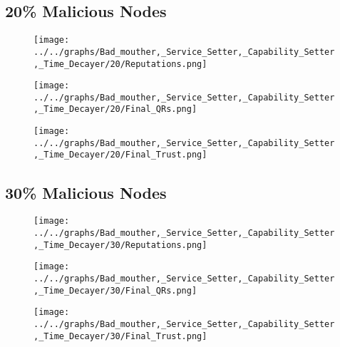\begin{minipage}[t]{0.49\columnwidth}
\subsection*{20\% Malicious Nodes}
    \begin{figure}[H]
        \centering
        \texttt{[image: ../../graphs/Bad\_mouther,\_Service\_Setter,\_Capability\_Setter,\_Time\_Decayer/20/Reputations.png]}
    \end{figure}
    \begin{figure}[H]
        \centering
        \texttt{[image: ../../graphs/Bad\_mouther,\_Service\_Setter,\_Capability\_Setter,\_Time\_Decayer/20/Final\_QRs.png]}
    \end{figure}
\end{minipage}
\begin{minipage}[t]{0.49\columnwidth}
    \begin{figure}[H]
        \centering
        \texttt{[image: ../../graphs/Bad\_mouther,\_Service\_Setter,\_Capability\_Setter,\_Time\_Decayer/20/Final\_Trust.png]}
    \end{figure}
\end{minipage}

\begin{minipage}[t]{0.49\columnwidth}
\subsection*{30\% Malicious Nodes}
    \begin{figure}[H]
        \centering
        \texttt{[image: ../../graphs/Bad\_mouther,\_Service\_Setter,\_Capability\_Setter,\_Time\_Decayer/30/Reputations.png]}
    \end{figure}
    \begin{figure}[H]
        \centering
        \texttt{[image: ../../graphs/Bad\_mouther,\_Service\_Setter,\_Capability\_Setter,\_Time\_Decayer/30/Final\_QRs.png]}
    \end{figure}
\end{minipage}
\begin{minipage}[t]{0.49\columnwidth}
    \begin{figure}[H]
        \centering
        \texttt{[image: ../../graphs/Bad\_mouther,\_Service\_Setter,\_Capability\_Setter,\_Time\_Decayer/30/Final\_Trust.png]}
    \end{figure}
\end{minipage}

